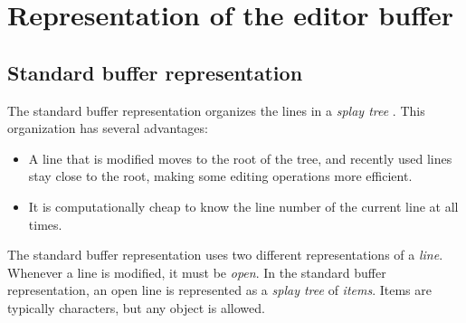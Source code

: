 \chapter{Representation of the editor buffer}
\label{chap-internals-buffer}

\section{Standard buffer representation}

The standard buffer representation organizes the lines in a
\emph{splay tree} \cite{Sleator:1985:SBS:3828.3835}.  This
organization has several advantages:

\begin{itemize}
\item A line that is modified moves to the root of the tree, and
  recently used lines stay close to the root, making some editing
  operations more efficient.
\item It is computationally cheap to know the line number of the
  current line at all times. 
\end{itemize}

The standard buffer representation uses two different representations
of a \emph{line}.  Whenever a line is modified, it must be
\emph{open}.  In the standard buffer representation, an open line is
represented as a \emph{splay tree} \cite{Sleator:1985:SBS:3828.3835}
of \emph{items}.  Items are typically characters, but any object is
allowed.

